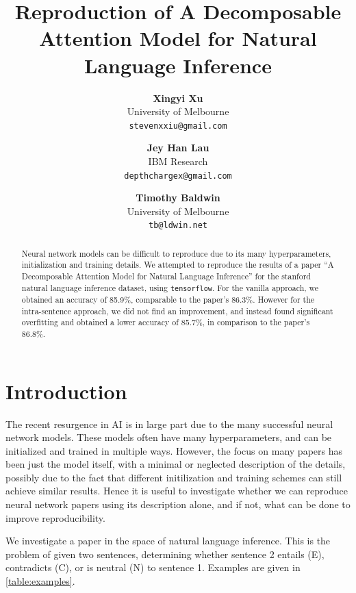 \documentclass{article}
\begin{document}
\title{Reproduction of A Decomposable Attention Model for Natural Language Inference}

\author{
  \textbf{Xingyi Xu} \\ University of Melbourne \\ \texttt{stevenxxiu@gmail.com} \and
  \textbf{Jey Han Lau} \\ IBM Research \\ \texttt{depthchargex@gmail.com} \and
  \textbf{Timothy Baldwin} \\ University of Melbourne \\ \texttt{tb@ldwin.net}
}
\maketitle

\begin{abstract}
Neural network models can be difficult to reproduce due to its many hyperparameters, initialization and training details. We attempted to reproduce the results of a paper ``A Decomposable Attention Model for Natural Language Inference'' for the stanford natural language inference dataset, using \texttt{tensorflow}. For the vanilla approach, we obtained an accuracy of 85.9\%, comparable to the paper's 86.3\%. However for the intra-sentence approach, we did not find an improvement, and instead found significant overfitting and obtained a lower accuracy of 85.7\%, in comparison to the paper's 86.8\%.
\end{abstract}

\section{Introduction}
The recent resurgence in AI is in large part due to the many successful neural network models. These models often have many hyperparameters, and can be initialized and trained in multiple ways. However, the focus on many papers has been just the model itself, with a minimal or neglected description of the details, possibly due to the fact that different initilization and training schemes can still achieve similar results. Hence it is useful to investigate whether we can reproduce neural network papers using its description alone, and if not, what can be done to improve reproducibility.

We investigate a paper in the space of natural language inference. This is the problem of given two sentences, determining whether sentence 2 entails (E), contradicts (C), or is neutral (N) to sentence 1. Examples are given in \autoref{table:examples}.
\end{document}
